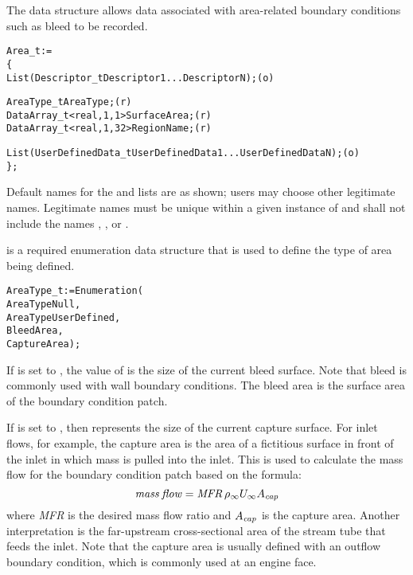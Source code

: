 The  data structure allows data associated with
area-related boundary conditions such as bleed to be recorded.

\begin{alltt}
  Area\_t :=
    \{
    List( Descriptor\_t  Descriptor1 ... DescriptorN ) ;                     (o)

    AreaType\_t AreaType ;                                                   (r)
    DataArray\_t<real, 1, 1>  SurfaceArea ;                                  (r)
    DataArray\_t<real, 1, 32> RegionName ;                                   (r)

    List( UserDefinedData\_t UserDefinedData1 ... UserDefinedDataN ) ;       (o)
    \} ;
\end{alltt}

\begin{notes}
\item
 Default names for the  and 
 lists are as shown; users may choose other legitimate names.
 Legitimate names must be unique within a given instance of
  and shall not include the names ,
 , or .
\end{notes}

 is a required enumeration data structure
that is used to define the type of area being defined.
\begin{alltt}
  AreaType\_t := Enumeration(
    AreaTypeNull,
    AreaTypeUserDefined,
    BleedArea,
    CaptureArea ) ;
\end{alltt}

If  is set to , the value of
 is the size of the current bleed surface.
Note that bleed is commonly used with wall boundary conditions.
The bleed area is the surface area of the boundary condition patch.

If  is set to , then
 represents the size of the current capture surface.
For inlet flows, for example, the capture area is the area of a
fictitious surface in front of the inlet in which mass is pulled into
the inlet.
This is used to calculate the mass flow for the boundary condition patch
based on the formula:
$$
{\it mass\:flow} = {\it MFR} \, \rho_{\infty} U_{\infty} A_{\it cap}
$$
where \textit{MFR} is the desired mass flow ratio and
$A_{\it cap}$ is the capture area.
Another interpretation is the far-upstream cross-sectional area of the
stream tube that feeds the inlet.
Note that the capture area is usually defined with an outflow boundary
condition, which is commonly used at an engine face.

